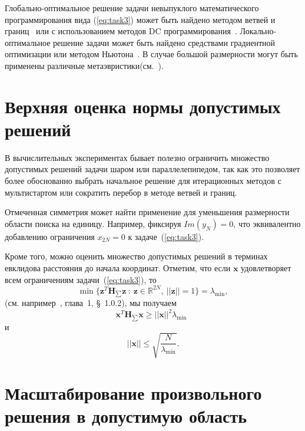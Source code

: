 Глобально-оптимальное решение задачи невыпуклого математического программирования вида (\ref{eq:task3}) может быть найдено методом
ветвей и границ~\cite{horst:global,tawarmalani:global} или с использованием методов DC программирования~\cite{horst:handbook,strekalovsky:global}. Локально-оптимальное решение задачи может быть найдено средствами градиентной оптимизации или методом Ньютона~\cite{himmelblau:nlp}. В случае большой размерности могут быть применены различные метаэвристики(см.~\cite{eberhart:swarm,storn:de}).


\section{Верхняя оценка нормы допустимых решений} \label{subsec:top}

В вычислительных экспериментах бывает полезно ограничить множество допустимых решений задачи шаром или параллелепипедом, так как это позволяет более обоснованно выбрать начальное решение для итерационных методов с мультистартом или сократить перебор в методе ветвей и границ.

Отмеченная симметрия может найти применение для уменьшения размерности области поиска на единицу. Например, фиксируя $Im(y_{N})=0$, что эквивалентно добавлению ограничения $x_{2N}=0$ к задаче~(\ref{eq:task3}).

Кроме того, можно оценить множество допустимых решений в терминах евклидова расстояния до начала координат. Отметим, что если $\textbf{x}$ удовлетворяет всем ограничениям задачи~(\ref{eq:task3}), то
$$
\min\{\textbf{z}^T \textbf{H}_{\sum} \textbf{z} \ : \ \textbf{z}\in
\mathbb{R}^{2N}, \ ||\textbf{z}|| =1\} = \lambda_{\min},
$$
(см. например~\cite{horn:matrix}, глава~1, \S~1.0.2), мы получаем
$$
\textbf{x}^T \textbf{H}_{\sum} \textbf{x} \ge ||\textbf{x}||^2
\lambda_{\min}\ \
$$
и
\begin{equation} \label{eqn:bound}
||\textbf{x}||\le \sqrt{\frac{N}{\lambda_{\min}}}.
\end{equation}

\section{Масштабирование произвольного решения в допустимую область} \label{sec:scaling}

